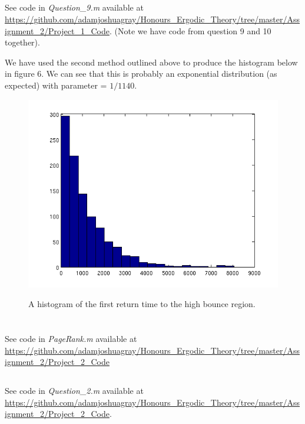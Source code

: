 \documentclass{unswmaths}
\begin{document}
\subsection{}

See code in \emph{Question\_9.m} available at \url{https://github.com/adamjoshuagray/Honours_Ergodic_Theory/tree/master/Assignment_2/Project_1_Code}. (Note we have code from question 9 and 10 together).

We have used the second method outlined above to produce the histogram below in figure 6. We can see that this is probably an exponential distribution (as expected) with parameter = $ 1 / 1140 $.
\begin{figure}[H]
    \includegraphics[scale=0.7]{Return_Histogram}
    \label{Histogram}
    \caption{A histogram of the first return time to the high bounce region. }
\end{figure}
\clearpage
\section{}
\subsection{}
See code in \emph{PageRank.m} available at \url{https://github.com/adamjoshuagray/Honours_Ergodic_Theory/tree/master/Assignment_2/Project_2_Code}

\subsection{}
See code in \emph{Question\_2.m} available at \url{https://github.com/adamjoshuagray/Honours_Ergodic_Theory/tree/master/Assignment_2/Project_2_Code}. 
\end{document}
